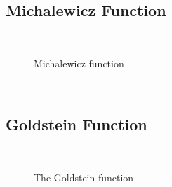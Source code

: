 \subsection{Michalewicz Function}
~
\begin{figure}[ht]
	\centering
	\setlength \fboxsep{0pt}
	\setlength \fboxrule{0.5pt}
	\caption{Michalewicz function}
	\label{fig:MichalewiczGraph}
\end{figure}
~
\subsection{Goldstein Function}
~
\begin{figure}[ht]
	\centering
	\setlength \fboxsep{0pt}
	\setlength \fboxrule{0.5pt}
	\caption{The Goldstein function}
	\label{fig:GoldsteinGraph}
\end{figure}
~
